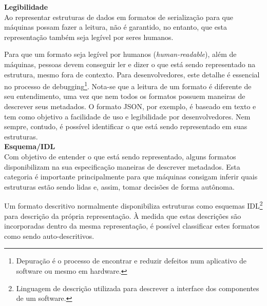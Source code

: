 \textbf{Legibilidade} \\

Ao representar estruturas de dados em formatos de serialização para que máquinas possam fazer a leitura, não é garantido, no entanto, que esta representação também seja legível por seres humanos.

Para que um formato seja legível por humanos (\textit{human-readable}), além de máquinas, pessoas devem conseguir ler e dizer o que está sendo representado na estrutura, mesmo fora de contexto. Para desenvolvedores, este detalhe é essencial no processo de debugging\footnote{
  Depuração é o processo de encontrar e reduzir defeitos num aplicativo de software ou mesmo em hardware.
}. Nota-se que a leitura de um formato é diferente de seu entendimento, uma vez que nem todos os formatos possuem maneiras de descrever seus metadados. O formato JSON, por exemplo, é baseado em texto e tem como objetivo a facilidade de uso e legibilidade por desenvolvedores. Nem sempre, contudo, é possível identificar o que está sendo representado em suas estruturas. \cite{SumarayMakki2012} \\

\textbf{Esquema/IDL} \\

Com objetivo de entender o que está sendo representado, alguns formatos disponibilizam na sua especificação maneiras de descrever metadados. Esta categoria é importante principalmente para que máquinas consigam inferir quais estruturas estão sendo lidas e, assim, tomar decisões de forma autônoma.

Um formato descritivo normalmente disponibiliza estruturas como esquemas IDL\footnote{
  Linguagem de descrição utilizada para descrever a interface dos componentes de um software.
} para descrição da própria representação. À medida que estas descrições são incorporadas dentro da mesma representação, é possível classificar estes formatos como sendo auto-descritivos. \cite{Rentachintala2014}
